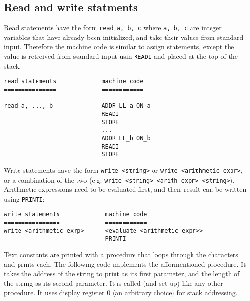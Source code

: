\documentclass[11pt]{article}
\begin{document}
\subsection{Read and write statments}

Read statements have the form \texttt{read a, b, c} where \texttt{a, b, c} are integer variables that have already been initialized, and take their values from standard input. Therefore the machine code is similar to assign statements, except the value is retreived from standard input usin \texttt{READI} and placed at the top of the stack.

\begin{verbatim}
read statements             machine code
===============             ============

read a, ..., b              ADDR LL_a ON_a
                            READI
                            STORE
                            ...
                            ADDR LL_b ON_b
                            READI
                            STORE
\end{verbatim}

Write statements have the form \texttt{write <string>} or \texttt{write <arithmetic expr>}, or a combination of the two (e.g. \texttt{write <string> <arith expr> <string>}). Arithmetic expressions need to be evaluated first, and their result can be written using \texttt{PRINTI}:

\begin{verbatim}
write statements             machine code
================             ============
write <arithmetic exrp>      <evaluate <arithmetic expr>>
                             PRINTI
\end{verbatim}

Text constants are printed with a procedure that loops through the characters and prints each. The following code implements the afformentioned procedure. It takes the address of the string to print as its first parameter, and the length of the string as its second parameter. It is called (and set up) like any other procedure. It uses display register 0 (an arbitrary choice) for stack addressing.
\end{document}
